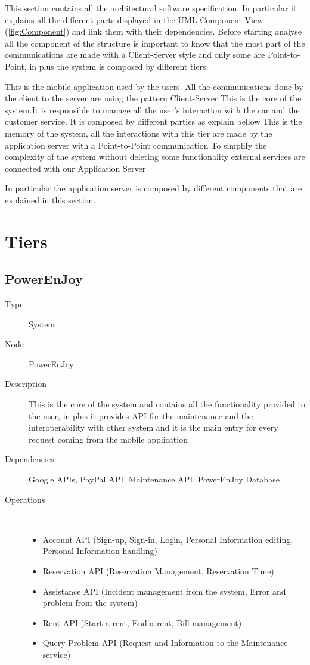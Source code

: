 This section contains all the architectural software specification. In particular it explains all the different parts displayed in the UML Component View (\ref{fig:Component}) and link them with their dependencies. Before starting analyse all the component of the structure is important to know that the most part of the communications are made with a Client-Server style and only some are Point-to-Point, in plus the system is composed by different tiers:
\begin{itemize}
	 This is the mobile application used by the users. All the communications done by the client to the server are using the pattern Client-Server
	 This is the core of the system.It is responsible to manage all the user's interaction with the car and the customer service. It is composed by different parties as explain bellow
	 This is the memory of the system, all the interactions with this tier are made by the application server with a Point-to-Point communication
	 To simplify the complexity of the system without deleting some functionality external services are connected with our Application Server
\end{itemize}
In particular the application server is composed by different components that are explained in this section.

\section{Tiers}
\subsection{PowerEnJoy}
\begin{description}
	\item[Type] System
	\item[Node] PowerEnJoy
	\item[Description] This is the core of the system and contains all the functionality provided to the user, in plus it provides API for the maintenance and the interoperability with other system and it is the main entry for every request coming from the mobile application
	\item[Dependencies] Google APIs, PayPal API, Maintenance API, PowerEnJoy Database
	\item[Operations] \ \\
		\begin{itemize}
			\item Account API (Sign-up, Sign-in, Login, Personal Information editing, Personal Information handling)
			\item Reservation API (Reservation Management, Reservation Time)
			\item Assistance API (Incident management from the system, Error and problem from the system)
			\item Rent API (Start a rent, End a rent, Bill management)
			\item Query Problem API (Request and Information to the Maintenance service)
		\end{itemize}
\end{description}

